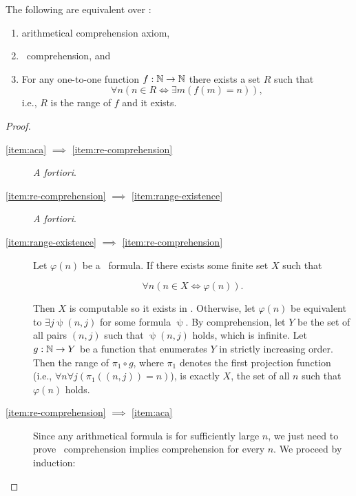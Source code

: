 \documentclass[../main.tex]{memoir}
\begin{document}
\begin{lemma}
  \label{lemma:aca-equivalences}
  The following are equivalent over \rca:

  \begin{enumerate}[label=(\roman*), ref=(\roman*)]
  \item \label{item:aca} arithmetical comprehension axiom,
  \item \label{item:re-comprehension} \re\ comprehension, and
  \item \label{item:range-existence} For any one-to-one function $f: \mathbb{N} \to \mathbb{N}$ there exists a set $R$ such that
    \[ \forall n (n \in R \iff \exists m (f(m) = n)), \]
    i.e., $R$ is the range of $f$ and it exists.
  \end{enumerate}
\end{lemma}
\begin{proof}
  \begin{description}
  \item[\ref{item:aca} $\implies$ \ref{item:re-comprehension}] \textit{A fortiori}.
  \item[\ref{item:re-comprehension} $\implies$ \ref{item:range-existence}] \textit{A fortiori}.
  \item[\ref{item:range-existence} $\implies$ \ref{item:re-comprehension}]
    Let $\varphi(n)$ be a \re\ formula. If there exists some finite set $X$ such that

    \[ \forall n (n \in X \iff \varphi(n)). \]

    Then $X$ is computable so it exists in \rca. Otherwise, let $\varphi(n)$ be equivalent to $\exists j \uppsi(n, j)$ for some  formula $\uppsi$. By  comprehension, let $Y$ be the set of all pairs $(n, j)$ such that $\uppsi(n, j)$ holds, which is infinite. Let $g: \mathbb{N} \to Y$ be a function that enumerates $Y$ in strictly increasing order. Then the range of $\pi_1 \circ g$, where $\pi_1$ denotes the first projection function (i.e., $\forall n \forall j (\pi_1((n, j)) = n)$), is exactly $X$, the set of all $n$ such that $\varphi(n)$ holds.
  \item[\ref{item:re-comprehension} $\implies$ \ref{item:aca}] Since any arithmetical formula is  for sufficiently large $n$, we just need to prove \re\ comprehension implies  comprehension for every $n$. We proceed by induction:


\end{description}
\end{proof}
\end{document}

